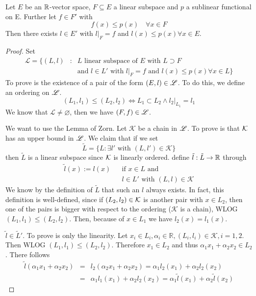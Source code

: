 \begin{lemma} Let $E$ be an $\mathbb{R}$-vector space, $F \subseteq E$ a linear subspace and $p$ a sublinear functional on E. Further let $f \in F'$ with
\begin{equation*}
f(x) \leq p(x) \quad \forall x \in F
\end{equation*}
Then there exists $l \in E'$ with $l\vert_F =f$ and $l(x) \leq p(x) \forall x \in E$.
\end{lemma}
\begin{proof}
Set
\begin{eqnarray*}
\mathcal{L}= \{ (L,l)&:& L \text{ linear subspace of } E \text{ with } L\supset F  \\
                     && \text{and } l \in L' \text{ with } l\vert_ F =f \text{ and } l(x)\leq p(x) \forall x \in L\}
\end{eqnarray*}
To prove is the existence of a pair of the form $(E,l) \in \mathscr{L}$. To do this, we define an ordering on $\mathscr{L}$.
\begin{equation*}
(L_1, l_1) \leq (L_2,l_2) \Leftrightarrow L_1 \subset L_2 \land l_2\vert_{L_1} = l_1
\end{equation*}
We know that $\mathcal{L}\neq \varnothing$, then we have $(F,f) \in \mathscr{L}$. 

We want to use the Lemma of Zorn. Let $\mathscr{K}$ be a chain in $\mathscr{L}$. To prove is that $\mathcal{K}$ has an upper bound in $\mathscr{L}$. We claim that if we set
\begin{equation*}
\tilde{L}= \{ L : \exists l' \text{ with } ( L,l') \in \mathscr{K} \}
\end{equation*} 
then $\tilde{L}$ is a linear subspace since $\mathcal{K}$ is linearly ordered. define $\tilde{l}: \tilde{L} \to \mathbb{R}$ through
\begin{eqnarray*}
\tilde{l}(x) := l(x) &&\text{if } x \in L \text { and }\\
 && l \in L' \text{ with } (L,l) \in \mathscr{K}
\end{eqnarray*}
We know by the definition of $\tilde{L}$ that such an $l$ always exists. In fact, this definition is well-defined, since if $(L_2,l_2) \in \mathcal{K}$ is another pair with $x \in L_2$, then one of the pairs is bigger with respect to the ordering ($\mathscr{K}$ is a chain), WLOG $(L_1,l_1) \leq (L_2,l_2)$. Then, because of $x \in L_1$ we have $l_2(x)=l_1(x)$.

$\tilde{l}\in \tilde{L}'$. To prove is only the linearity. Let $x_i \in L_i, \alpha_i \in \mathbb{R}, (L_i, l_i) \in \mathscr{K}, i=1,2$. Then WLOG $(L_1,l_1) \leq (L_2,l_2)$. Therefore $x_1  \in L_2$ and thus $\alpha_1 x_1 +\alpha_2 x_2 \in  L_2$. There follows
\begin{eqnarray*}
\tilde{l}(\alpha_1 x_1 + \alpha_2 x_2) &=& l_2(\alpha_2 x_1 +\alpha_2 x_2)  = \alpha_1 l_2(x_1) + \alpha_2 l_2(x_2) \\
 &=& \alpha_1 l_1(x_1) + \alpha_2 l_2(x_2) = \alpha_1 \tilde{l}(x_1) + \alpha_2 \tilde{l}(x_2)
\end{eqnarray*}



\end{proof}

